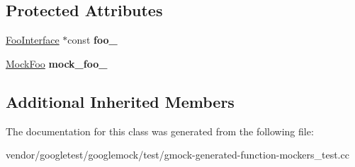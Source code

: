 \subsection*{Protected Attributes}
\begin{DoxyCompactItemize}
\item 
\mbox{\label{classtesting_1_1gmock__generated__function__mockers__test_1_1_function_mocker_test_ae2b8b577c4808f2dff9797168468f65f}} 
\mbox{\hyperlink{classtesting_1_1gmock__generated__function__mockers__test_1_1_foo_interface}{Foo\+Interface}} $\ast$const {\bfseries foo\+\_\+}
\item 
\mbox{\label{classtesting_1_1gmock__generated__function__mockers__test_1_1_function_mocker_test_a265659f07a0e75152ab295add4769585}} 
\mbox{\hyperlink{classtesting_1_1gmock__generated__function__mockers__test_1_1_mock_foo}{Mock\+Foo}} {\bfseries mock\+\_\+foo\+\_\+}
\end{DoxyCompactItemize}
\subsection*{Additional Inherited Members}


The documentation for this class was generated from the following file\+:\begin{DoxyCompactItemize}
\item 
vendor/googletest/googlemock/test/gmock-\/generated-\/function-\/mockers\+\_\+test.\+cc\end{DoxyCompactItemize}
